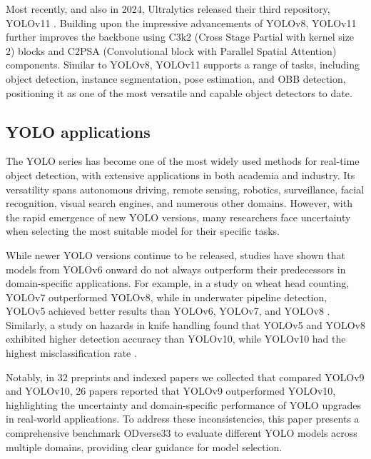 Most recently, and also in 2024, Ultralytics released their third repository, YOLOv11 \cite{Jocher2024}. Building upon the impressive advancements of YOLOv8, YOLOv11 further improves the backbone using C3k2 (Cross Stage Partial with kernel size 2) blocks and C2PSA (Convolutional block with Parallel Spatial Attention) components. Similar to YOLOv8, YOLOv11 supports a range of tasks, including object detection, instance segmentation, pose estimation, and OBB detection, positioning it as one of the most versatile and capable object detectors to date.





\subsection{YOLO applications}
The YOLO series has become one of the most widely used methods for real-time object detection, with extensive applications in both academia and industry. Its versatility spans autonomous driving, remote sensing, robotics, surveillance, facial recognition, visual search engines, and numerous other domains. However, with the rapid emergence of new YOLO versions, many researchers face uncertainty when selecting the most suitable model for their specific tasks.

While newer YOLO versions continue to be released, studies have shown that models from YOLOv6 onward do not always outperform their predecessors in domain-specific applications. For example, in a study on wheat head counting, YOLOv7 outperformed YOLOv8, while in underwater pipeline detection, YOLOv5 achieved better results than YOLOv6, YOLOv7, and YOLOv8 \cite{Gasparovic2023}. Similarly, a study on hazards in knife handling found that YOLOv5 and YOLOv8 exhibited higher detection accuracy than YOLOv10, while YOLOv10 had the highest misclassification rate \cite{Geetha2024}.

Notably, in 32 preprints and indexed papers we collected that compared YOLOv9 and YOLOv10, 26 papers reported that YOLOv9 outperformed YOLOv10, highlighting the uncertainty and domain-specific performance of YOLO upgrades in real-world applications. To address these inconsistencies, this paper presents a comprehensive benchmark ODverse33 to evaluate different YOLO models across multiple domains, providing clear guidance for model selection.